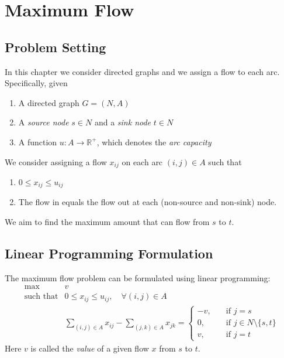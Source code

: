 \chapter{Maximum Flow}

\section{Problem Setting}
In this chapter we consider directed graphs and we assign a flow to each arc.
Specifically, given
\begin{enumerate}
\item
A directed graph $G=(N,A)$
\item
A \emph{source node} $s\in N$ and a \emph{sink node} $t\in N$
\item
A function $u:A\to\mathbb{R}^+$, which denotes the \emph{arc capacity}
\end{enumerate}

\begin{definition}
We consider assigning a flow $x_{ij}$ on each arc $(i,j)\in A$ such that
\begin{enumerate}
\item
$0\le x_{ij}\le u_{ij}$
\item
The flow in equals the flow out at each (non-source and non-sink) node.
\end{enumerate}
\end{definition}
We aim to find the maximum amount that can flow from $s$ to $t$.

\section{Linear Programming Formulation}
The maximum flow problem can be formulated using linear programming:
\begin{equation}\label{Eq:6:1}
\begin{array}{ll}
\max&v\\
\mbox{such that}&0\le x_{ij}\le u_{ij},\quad \forall(i,j)\in A\\
&\sum_{(i,j)\in A}x_{ij} - \sum_{(j,k)\in A}x_{jk}=\left\{
\begin{aligned}
-v,&\quad \text{if $j=s$}\\
0,&\quad \text{if $j\in N\setminus\{s,t\}$}\\
v,&\quad\text{if $j=t$}
\end{aligned}
\right.
\end{array}
\end{equation}
Here $v$ is called the \emph{value} of a given flow $x$ from $s$ to $t$.

